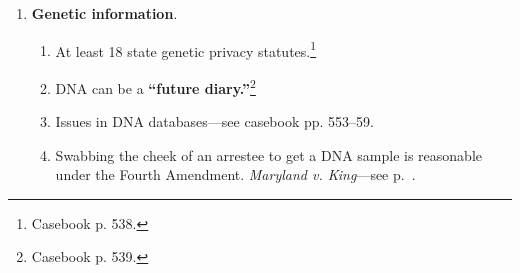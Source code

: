 \begin{enumerate}
    \begin{enumerate}
        \item There are two types of privacy interests: \textbf{informational} 
        and \textbf{decisional}. \emph{Whalen v. Roe}.
        \item \textbf{Constitutional torts}: 42 U.S.C. \S\ 1983 provides civil 
        remedies for constitutional violations. Constitutional violations 
        become tort actions, enabling plaintiffs to win damages and injunctive 
        relief.\footnote{Casebook p. 510--11.} There must be a \textbf{state 
        actor}. Plaintiffs \emph{cannot} directly sue states because of the 
        Eleventh Amendment, but they \emph{can} sue any state or local 
        government official. They can also sue local governments when their 
        policy or custom inflicts the injury.\footnote{Casebook p. 510--11.}
        \item Hospital chaplains can't have open access to patient records, 
        but they can know the patient's ``basic problem.'' \emph{Carter v. 
        BMC}.
        \item To disclose a person's HIV status, the state must show a 
        compelling government interest that outweighs the substantial privacy 
        interest. \emph{Doe v. Borough of Barrington}.
        \item The seven \emph{Westinhouse} factors weight the privacy interest 
        against competing interests. \footnote{Casebook p. 520.} Interest like 
        containing healthcare costs can outweigh individual privacy interests. 
        \emph{Doe v. SEPTA}.
    \end{enumerate}
    \item \textbf{Genetic information}.
    \begin{enumerate}
        \item At least 18 state genetic privacy statutes.\footnote{Casebook p. 
        538.}
        \item DNA can be a \textbf{``future diary.''}\footnote{Casebook p. 
        539.}
        \item Issues in DNA databases---see casebook pp. 553--59.
        \item Swabbing the cheek of an arrestee to get a DNA sample is 
        reasonable under the Fourth Amendment. \emph{Maryland v. King}---see 
        p.~\pageref{sub:maryland-v-king}.
    \end{enumerate}
\end{enumerate}

